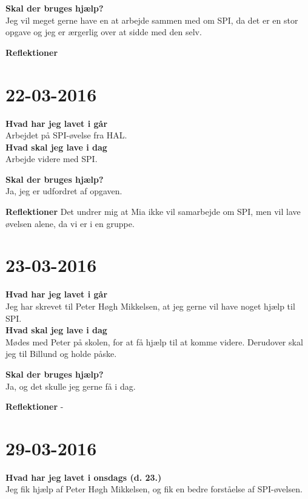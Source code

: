 \documentclass{article}
\begin{document}
	\textbf{Skal der bruges hjælp?}\\
	Jeg vil meget gerne have en at arbejde sammen med om SPI, da det er en stor opgave og jeg er ærgerlig over at sidde med den selv.
	
	\textbf{Reflektioner}
	
	
	
	\section{22-03-2016}
	
	\textbf{Hvad har jeg lavet i går}\\
	Arbejdet på SPI-øvelse fra HAL.\\
	
	\textbf{Hvad skal jeg lave i dag}\\
	Arbejde videre med SPI.    
	
	\textbf{Skal der bruges hjælp?}\\
	Ja, jeg er udfordret af opgaven.
	
	\textbf{Reflektioner}
	Det undrer mig at Mia ikke vil samarbejde om SPI, men vil lave øvelsen alene, da vi er i en gruppe. 
	
	
	\section{23-03-2016}
	
	\textbf{Hvad har jeg lavet i går}\\
	Jeg har skrevet til Peter Høgh Mikkelsen, at jeg gerne vil have noget hjælp til SPI. \\
	
	\textbf{Hvad skal jeg lave i dag}\\
	Mødes med Peter på skolen, for at få hjælp til at komme videre. Derudover skal jeg til Billund og holde påske.    
	
	\textbf{Skal der bruges hjælp?}\\
	Ja, og det skulle jeg gerne få i dag.
	
	\textbf{Reflektioner}
	- 
	

	\section{29-03-2016}
	
	\textbf{Hvad har jeg lavet i onsdags (d. 23.)}\\
	Jeg fik hjælp af Peter Høgh Mikkelsen, og fik en bedre forståelse af SPI-øvelsen.\\
	
\end{document}
